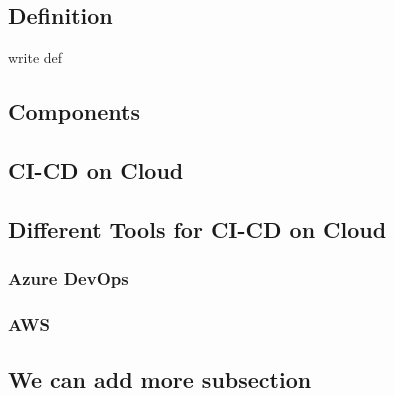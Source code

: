 \subsection{Definition}
write def
%
\subsection{Components}
%
\subsection{CI-CD on Cloud}
%
\subsection{Different Tools for CI-CD on Cloud}
%
\subsubsection{Azure DevOps}

%
\subsubsection{AWS}
%
\subsection{We can add more subsection}